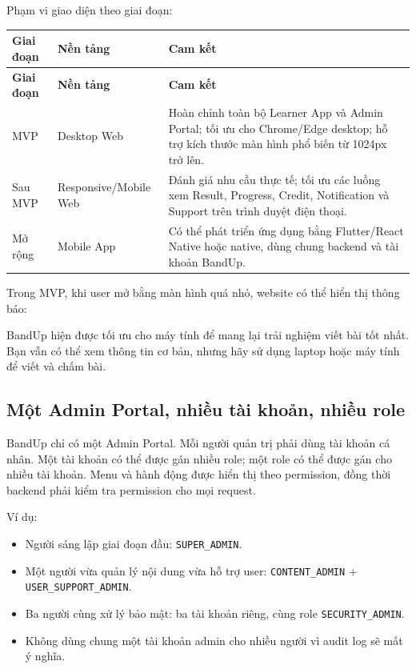 \documentclass[11pt,a4paper]{article}
\begin{document}
Phạm vi giao diện theo giai đoạn:
\begin{longtable}{|P{0.20\textwidth}|P{0.30\textwidth}|P{0.40\textwidth}|}
\hline
\textbf{Giai đoạn} & \textbf{Nền tảng} & \textbf{Cam kết} \\ \hline
\endfirsthead
\hline
\textbf{Giai đoạn} & \textbf{Nền tảng} & \textbf{Cam kết} \\ \hline
\endhead
MVP & Desktop Web & Hoàn chỉnh toàn bộ Learner App và Admin Portal; tối ưu cho Chrome/Edge desktop; hỗ trợ kích thước màn hình phổ biến từ 1024px trở lên. \\ \hline
Sau MVP & Responsive/Mobile Web & Đánh giá nhu cầu thực tế; tối ưu các luồng xem Result, Progress, Credit, Notification và Support trên trình duyệt điện thoại. \\ \hline
Mở rộng & Mobile App & Có thể phát triển ứng dụng bằng Flutter/React Native hoặc native, dùng chung backend và tài khoản BandUp. \\ \hline
\end{longtable}

Trong MVP, khi user mở bằng màn hình quá nhỏ, website có thể hiển thị thông báo:
\begin{copybox}
BandUp hiện được tối ưu cho máy tính để mang lại trải nghiệm viết bài tốt nhất. Bạn vẫn có thể xem thông tin cơ bản, nhưng hãy sử dụng laptop hoặc máy tính để viết và chấm bài.
\end{copybox}

\subsection{Một Admin Portal, nhiều tài khoản, nhiều role}
\begin{decisionbox}
BandUp chỉ có một Admin Portal. Mỗi người quản trị phải dùng tài khoản cá nhân. Một tài khoản có thể được gán nhiều role; một role có thể được gán cho nhiều tài khoản. Menu và hành động được hiển thị theo permission, đồng thời backend phải kiểm tra permission cho mọi request.
\end{decisionbox}

Ví dụ:
\begin{itemize}
  \item Người sáng lập giai đoạn đầu: \texttt{SUPER\_ADMIN}.
  \item Một người vừa quản lý nội dung vừa hỗ trợ user: \texttt{CONTENT\_ADMIN} + \texttt{USER\_SUPPORT\_ADMIN}.
  \item Ba người cùng xử lý bảo mật: ba tài khoản riêng, cùng role \texttt{SECURITY\_ADMIN}.
  \item Không dùng chung một tài khoản admin cho nhiều người vì audit log sẽ mất ý nghĩa.
\end{itemize}
\end{document}
